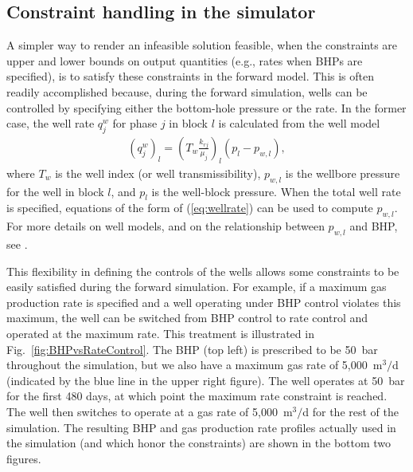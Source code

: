 \documentclass[twocolumn,numbook]{svjour3}          %
\begin{document}
\subsection{Constraint handling in the simulator}  \label{sec:constr-sim}

A simpler way to render an infeasible solution feasible, when the
constraints are upper and lower bounds on output quantities 
(e.g., rates when BHPs are specified), is to satisfy these constraints 
in the forward model. This is often readily accomplished because, during the forward
simulation, wells can be controlled by specifying either the bottom-hole 
pressure or the rate. In the former case,
the well rate $q_j^w$ for phase $j$ in block $l$ is calculated from the well model
%
\begin{align}
\label{eq:wellrate}
  \left( q_j^w \right)_l = \left( T_w\frac{k_{rj}}{\mu_j} \right)_l (p_l - p_{w,l}),
\end{align}
%
where $T_w$ is the well index (or well transmissibility), $p_{w,l}$ is the 
wellbore pressure for the well in block $l$, and $p_l$ is the well-block pressure.
When the total well rate is specified, equations of the form of (\ref{eq:wellrate}) 
can be used to compute $p_{w,l}$. For more details on well models, and on the 
relationship between $p_{w,l}$ and BHP, see \cite{Cao:Thesis}.
%

This flexibility in defining the controls of the wells allows some constraints
to be easily satisfied during the forward simulation. For example, if a maximum
gas production rate is specified and a well operating under BHP control violates
this maximum, the well can be switched from BHP control to rate control and
operated at the maximum rate. This treatment is illustrated in
Fig.~\ref{fig:BHPvsRateControl}. The BHP (top left) is prescribed to be 50~bar
throughout the simulation, but we also have a maximum gas rate of 5,000~m$^3/$d
(indicated by the blue line in the upper right figure). The well operates at
50~bar for the first 480 days, at which point the maximum rate constraint is
reached. The well then switches to operate at a gas rate of 5,000~m$^3/$d for the
rest of the simulation. The resulting BHP and gas production rate profiles
actually used in the simulation (and which honor the constraints) are shown in
the bottom two figures.
\end{document}
